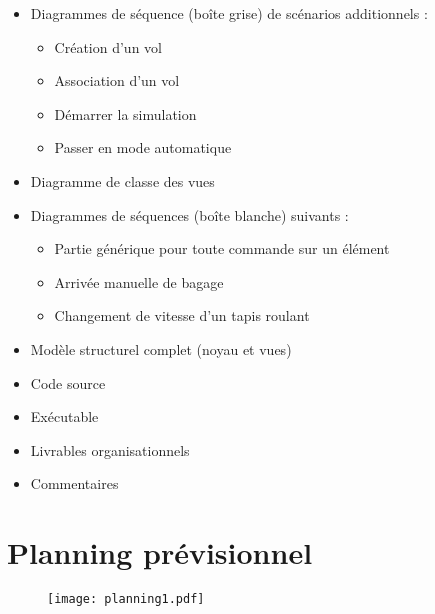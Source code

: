\begin{itemize}
	\item Diagrammes de séquence (boîte grise) de scénarios additionnels \Proto{} :
	\begin{itemize}
		\item Création d'un vol
		\item Association d'un vol
		\item Démarrer la simulation
		\item Passer en mode automatique
	\end{itemize}
	\item Diagramme de classe des vues
	\item Diagrammes de séquences (boîte blanche) suivants \Proto{} :
	\begin{itemize}
		\item Partie générique pour toute commande sur un élément
		\item Arrivée manuelle de bagage
		\item Changement de vitesse d'un tapis roulant
	\end{itemize}
	\item Modèle structurel complet (noyau et vues) \Proto
	\item Code source \Proto
	\item Exécutable \Proto
\end{itemize}

\begin{itemize}
	\item Livrables organisationnels
	\item Commentaires
\end{itemize}


\section{Planning prévisionnel}
\newpage
\begin{figure}[H]
	\texttt{[image: planning1.pdf]}
\end{figure}

